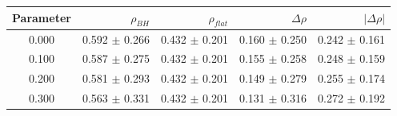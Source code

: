 \begin{tabular}{c r r r r}
\toprule
Parameter & $\rho_{BH}$ & $\rho_{flat}$ & $\Delta\rho$ & $|\Delta\rho|$ \\
\midrule
0.000 & 0.592 $\pm$ 0.266 & 0.432 $\pm$ 0.201 & 0.160 $\pm$ 0.250 & 0.242 $\pm$ 0.161 \\
0.100 & 0.587 $\pm$ 0.275 & 0.432 $\pm$ 0.201 & 0.155 $\pm$ 0.258 & 0.248 $\pm$ 0.159 \\
0.200 & 0.581 $\pm$ 0.293 & 0.432 $\pm$ 0.201 & 0.149 $\pm$ 0.279 & 0.255 $\pm$ 0.174 \\
0.300 & 0.563 $\pm$ 0.331 & 0.432 $\pm$ 0.201 & 0.131 $\pm$ 0.316 & 0.272 $\pm$ 0.192 \\
\bottomrule
\end{tabular}